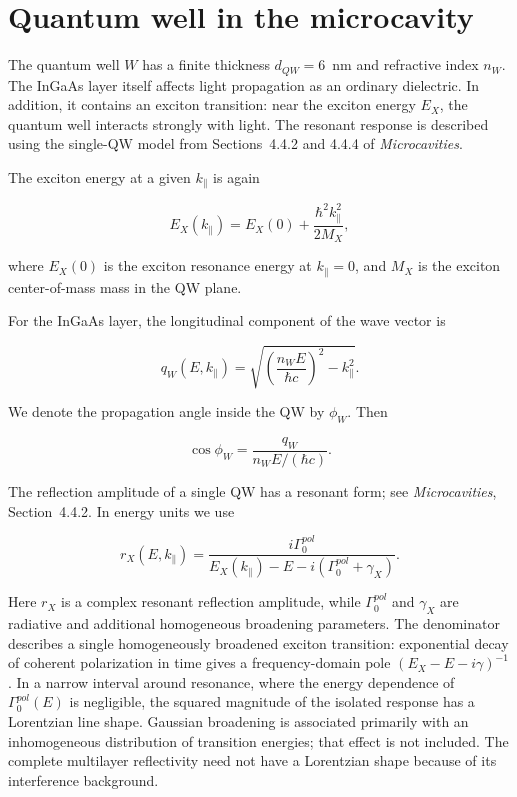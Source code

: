 \documentclass[12pt,a4paper]{article}
\begin{document}
\clearpage
\section{Quantum well in the microcavity}

The quantum well $W$ has a finite thickness $d_{QW}=6$~nm and refractive index $n_W$. The InGaAs layer itself affects light propagation as an ordinary dielectric. In addition, it contains an exciton transition: near the exciton energy $E_X$, the quantum well interacts strongly with light. The resonant response is described using the single-QW model from Sections~4.4.2 and 4.4.4 of \textit{Microcavities}.

The exciton energy at a given $k_\parallel$ is again

\[
E_X(k_\parallel)
=
E_X(0)
+
\frac{\hbar^2k_\parallel^2}{2M_X},
\]

where $E_X(0)$ is the exciton resonance energy at $k_\parallel=0$, and $M_X$ is the exciton center-of-mass mass in the QW plane.

For the InGaAs layer, the longitudinal component of the wave vector is

\[
q_W(E,k_\parallel)
=
\sqrt{
\left(\frac{n_WE}{\hbar c}\right)^2-k_\parallel^2
}.
\]

We denote the propagation angle inside the QW by $\phi_W$. Then

\[
\cos\phi_W
=
\frac{q_W}{n_WE/(\hbar c)}.
\]

The reflection amplitude of a single QW has a resonant form; see \textit{Microcavities}, Section~4.4.2. In energy units we use

\[
r_X(E,k_\parallel)
=
\frac{i\Gamma_0^{pol}}
{E_X(k_\parallel)-E-i\left(\Gamma_0^{pol}+\gamma_X\right)}.
\]


Here $r_X$ is a complex resonant reflection amplitude, while
$\Gamma_0^{pol}$ and $\gamma_X$ are radiative and additional homogeneous
broadening parameters. The denominator describes a single homogeneously
broadened exciton transition: exponential decay of coherent polarization
in time gives a frequency-domain pole $(E_X-E-i\gamma)^{-1}$. In a narrow
interval around resonance, where the energy dependence of
$\Gamma_0^{pol}(E)$ is negligible, the squared magnitude of the isolated
response has a Lorentzian line shape. Gaussian broadening is associated
primarily with an inhomogeneous distribution of transition energies;
that effect is not included. The complete multilayer reflectivity need
not have a Lorentzian shape because of its interference background.
\end{document}
